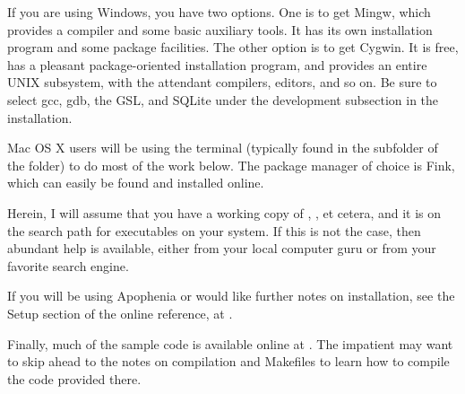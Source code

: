 \documentclass[12pt]{article}
\begin{document}
If you are using Windows, you have two options. One is to get
Mingw, which provides a compiler and some basic auxiliary tools. It has its
own installation program and some package facilities. The other option is to
get Cygwin.  It is free, has a pleasant package-oriented installation
program, and provides an entire UNIX subsystem, with the attendant
compilers, editors, and so on. Be sure to select gcc, gdb, the GSL,
and SQLite under the development subsection in the installation.

Mac OS X users will be using the terminal (typically found in the
 subfolder of the  folder) to do most of the
work below. The package manager of choice is Fink, which can easily be
found and installed online.

Herein, I will assume that you have a working copy of ,
, et cetera, and it is on the search path for executables
on your system. If this is not the case, then abundant help is available,
either from your local computer guru or from your favorite search engine.

If you will be using Apophenia or would like further notes on
installation, see the Setup section of the online reference, at
\onlinereflocation.


Finally, much of the sample code is available online at
\samplecodelocation. The impatient may want to skip ahead to the notes on
compilation and Makefiles to learn how to compile the code provided 
there.

\end{document}

